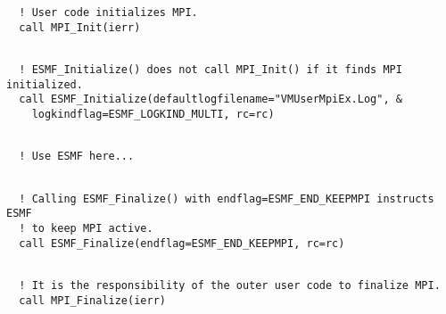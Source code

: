 
 \begin{verbatim}
  ! User code initializes MPI.
  call MPI_Init(ierr)
 
\end{verbatim}
 

 \begin{verbatim}
  ! ESMF_Initialize() does not call MPI_Init() if it finds MPI initialized.
  call ESMF_Initialize(defaultlogfilename="VMUserMpiEx.Log", &
    logkindflag=ESMF_LOGKIND_MULTI, rc=rc)
 
\end{verbatim}
 

 \begin{verbatim}
  ! Use ESMF here...
 
\end{verbatim}
 

 \begin{verbatim}
  ! Calling ESMF_Finalize() with endflag=ESMF_END_KEEPMPI instructs ESMF
  ! to keep MPI active.
  call ESMF_Finalize(endflag=ESMF_END_KEEPMPI, rc=rc)
 
\end{verbatim}
 

 \begin{verbatim}
  ! It is the responsibility of the outer user code to finalize MPI.
  call MPI_Finalize(ierr)
 
\end{verbatim}

\setlength{\parskip}{\oldparskip}
\setlength{\parindent}{\oldparindent}
\setlength{\baselineskip}{\oldbaselineskip}
